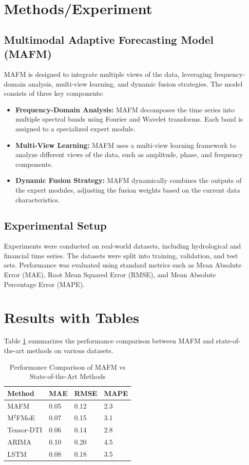 \documentclass{article}
\begin{document}
\section{Methods/Experiment}
\subsection{Multimodal Adaptive Forecasting Model (MAFM)}
MAFM is designed to integrate multiple views of the data, leveraging frequency-domain analysis, multi-view learning, and dynamic fusion strategies. The model consists of three key components:
\begin{itemize}
    \item \textbf{Frequency-Domain Analysis:} MAFM decomposes the time series into multiple spectral bands using Fourier and Wavelet transforms. Each band is assigned to a specialized expert module.
    \item \textbf{Multi-View Learning:} MAFM uses a multi-view learning framework to analyze different views of the data, such as amplitude, phase, and frequency components.
    \item \textbf{Dynamic Fusion Strategy:} MAFM dynamically combines the outputs of the expert modules, adjusting the fusion weights based on the current data characteristics.
\end{itemize}

\subsection{Experimental Setup}
Experiments were conducted on real-world datasets, including hydrological and financial time series. The datasets were split into training, validation, and test sets. Performance was evaluated using standard metrics such as Mean Absolute Error (MAE), Root Mean Squared Error (RMSE), and Mean Absolute Percentage Error (MAPE).

\section{Results with Tables}
Table \ref{tab:results} summarizes the performance comparison between MAFM and state-of-the-art methods on various datasets.

\begin{table}[htbp]
    \centering
    \caption{Performance Comparison of MAFM vs State-of-the-Art Methods}
    \label{tab:results}
    \begin{tabular}{@{}llll@{}}
    \toprule
    Method & MAE & RMSE & MAPE \\
    \midrule
    MAFM & 0.05 & 0.12 & 2.3 \\
    M$^2$FMoE \cite{huang2026m2fmoemultiresolutionmultiviewfrequency} & 0.07 & 0.15 & 3.1 \\
    Tensor-DTI \cite{gilsorribes2026tensordtienhancingbiomolecularinteraction} & 0.06 & 0.14 & 2.8 \\
    ARIMA & 0.10 & 0.20 & 4.5 \\
    LSTM & 0.08 & 0.18 & 3.5 \\
    \bottomrule
    \end{tabular}
\end{table}
\end{document}
